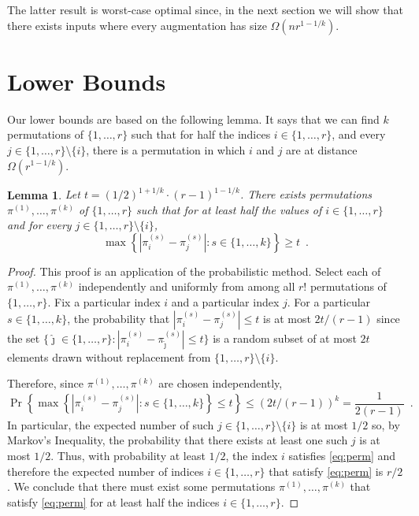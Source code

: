 \documentclass[11pt]{patmorin}
\newtheorem{lemma}[theorem]{Lemma}
\begin{document}
The latter result is worst-case optimal since, in the next section we will show that there exists inputs where every augmentation has size $\Omega(nr^{1-1/k})$.


\section{Lower Bounds}\label{section:Lower bound}

Our lower bounds are based on the following lemma. It says that we can find $k$ permutations of $\{1,\ldots,r\}$ such that for half the indices $i\in\{1,\ldots,r\}$, and every $j\in\{1,\ldots,r\}\setminus\{i\}$, there is a permutation in which $i$ and $j$ are at distance $\Omega(r^{1-1/k})$.

\begin{lemma}\label{lem:permutations}
Let $t=(1/2)^{1+1/k}\cdot(r-1)^{1-1/k}$.  There exists permutations $\pi^{(1)},\ldots,\pi^{(k)}$ of $\{1,\ldots,r\}$ such that for at least half the values of $i\in\{1,\ldots,r\}$ and for every $j\in\{1,\ldots,r\}\setminus\{i\}$,
\begin{equation}
 \max\left\{\left|\pi^{(s)}_i-\pi^{(s)}_j\right|\colon s\in\{1,\ldots,k\} \right\}
 \ge t \enspace .
     \label{eq:perm}
\end{equation}
\end{lemma}

\begin{proof}
  This proof is an application of the probabilistic method.  Select each
  of $\pi^{(1)},\ldots,\pi^{(k)}$ independently and uniformly from among
  all $r!$ permutations of $\{1,\ldots,r\}$.  Fix a particular index $i$
  and a particular index $j$.  For a particular $s\in\{1,\ldots,k\}$, the
  probability that $|\pi^{(s)}_i-\pi^{(s)}_j|\le t$ is at most $2t/(r-1)$
  since the set
  $\{\hat \jmath\in\{1,\ldots,r\} \colon |\pi^{(s)}_i-\pi^{(s)}_{\hat
   \jmath}|\le t\}$ is a random subset of at most $2t$ elements drawn without
  replacement from $\{1,\ldots,r\}\setminus \{i\}$.

  Therefore, since $\pi^{(1)},\ldots,\pi^{(k)}$ are chosen independently, 
  \[
    \Pr\left\{\max\left\{\left|\pi^{(s)}_i-\pi^{(s)}_j\right|\colon s\in\{1,\ldots,k\} \right\}\le t\right\} \le (2t/(r-1))^k = \frac{1}{2(r-1)} \enspace .
  \]
  In particular, the expected number of such
  $j\in\{1,\ldots,r\}\setminus\{i\}$ is at most $1/2$ so, by Markov's
  Inequality, the probability that there exists at least one such $j$
  is at most $1/2$.  Thus, with probability at least $1/2$, the index $i$
  satisfies \eqref{eq:perm} and therefore the expected number of indices $i\in\{1,\ldots,r\}$
  that satisfy \eqref{eq:perm} is $r/2$.  We conclude that there must exist
  some permutations $\pi^{(1)},\ldots,\pi^{(k)}$ that satisfy \eqref{eq:perm}
  for at least half the indices $i\in\{1,\ldots,r\}$.
\end{proof}
\end{document}
